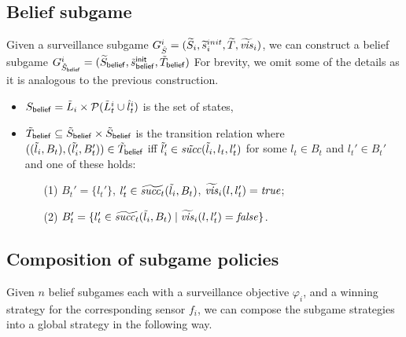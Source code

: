 \subsection{Belief subgame}
Given a surveillance subgame $G^{i}_{\hat{S}} = (\widetilde{S}_i,\widetilde{s}_i^{init},\widetilde{T},\widetilde{\mathit{vis}}_i)$, we can construct a belief subgame $G^{i}_{\tilde{S}_{\mathsf{belief}}} = (\widetilde{S}_{\mathsf{belief}},\tilde{s}^{\mathsf{init}}_{\mathsf{belief}},\tilde{T}_{\mathsf{belief}})$  For brevity, we omit some of the details as it is analogous to the previous construction. 

\begin{itemize}
\item $S_{\mathsf{belief}} = \tilde{L}_i \times \mathcal{P}(\tilde{L}^i_t \cup \hat{l}_t^i)$ is the set of states,
\item $\tilde{T}_{\mathsf{belief}} \subseteq \tilde{S}_{\mathsf{belief}} \times \tilde{S}_{\mathsf{belief}}$ is the transition relation where $((\tilde{l}_i, B_t),(\tilde{l}_i', B_t')) \in \tilde{T}_{\mathsf{belief}}$ iff $\tilde{l}_i' \in  \tilde{\mathit{succ}}(\tilde{l}_i,l_t,l_t')$ for some $l_t \in B_t$ and $l_t' \in B_t'$ and one of these holds:
\begin{itemize}
\item[(1)] $B_t' = \{l_t'\}$, $l_t' \in \widetilde{\mathit{succ}_t}(\tilde{l}_i,B_t)$, $\widetilde{\mathit{vis}}_i(l,l_t') = \mathit{true}$;
\item[(2)] $B_t' = \{l_t' \in \widetilde{\mathit{succ}_t}(\tilde{l}_i,B_t)  \mid  \widetilde{\mathit{vis}}_i(l,l_t') = \mathit{false} \}$.
\end{itemize}
\end{itemize}

\subsection{Composition of subgame policies}
Given $n$ belief subgames each with a surveillance objective $\varphi_i$, and a winning strategy for the corresponding sensor $f_i$, we can compose the subgame strategies into a global strategy in the following way.

